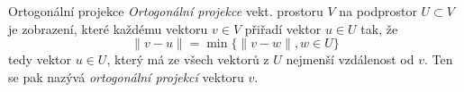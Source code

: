 \begin{definiceN}{Ortogonální projekce}
\emph{Ortogonální projekce} vekt. prostoru $V$ na podprostor $U\subset V$ je zobrazení, které každému vektoru $v\in V$ přiřadí vektor $u\in U$ tak, že 
$$\|v-u\|=\min\{\|v-w\|, w \in U\}$$
tedy vektor $u \in U$, který má ze všech vektorů z $U$ nejmenší vzdálenost od $v$. Ten se pak nazývá \emph{ortogonální projekcí} vektoru $v$.
\end{definiceN}
